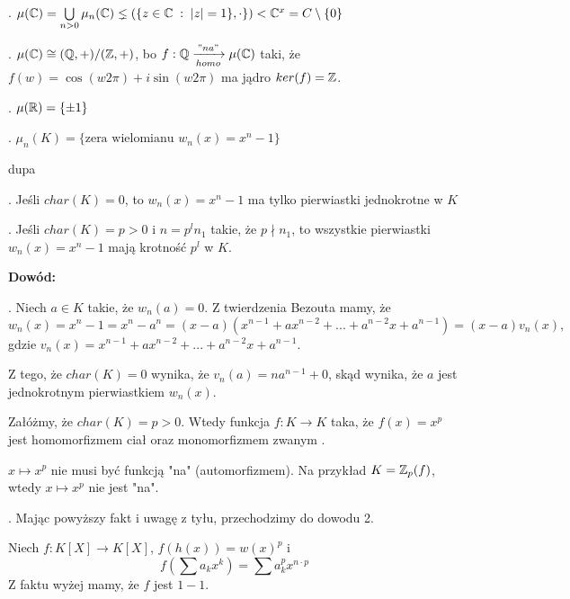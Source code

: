 . $\mu(\mathbb{C})=\bigcup\limits_{n>0}\mu_n(\mathbb{C})\lneq(\{z\in\mathbb{C}\;:\;|z|=1\},\cdot\})<\mathbb{C}^x=C\setminus\{0\}$

. $\mu(\mathbb{C})\cong(\mathbb{Q},+)/(\mathbb{Z},+)$, bo $f:\mathbb{Q}\xrightarrow[homo]{"na"}\mu(\mathbb{C})$ taki, że $f(w)=\cos(w2\pi)+i\sin(w2\pi)$ ma jądro $ker(f)=\mathbb{Z}$.

. $\mu(\mathbb{R})=\{\pm1\}$

. $\mu_n(K)=\{\text{zera wielomianu }w_n(x)=x^n-1\}$

\begin{uwaga}{\color{back}dupa}

. Jeśli $char(K)=0$, to $w_n(x)=x^n-1$ ma tylko pierwiastki jednokrotne w $K$

. Jeśli $char(K)=p>0$ i $n=p^ln_1$ takie, że $p\nmid n_1$, to wszystkie pierwiastki $w_n(x)=x^n-1$ mają krotność $p^l$ w $K$.
\end{uwaga}

\textbf{Dowód:}

. Niech $a\in K$ takie, że $w_n(a)=0$. Z twierdzenia Bezouta mamy, że
$$w_n(x)=x^n-1=x^n-a^n=(x-a)(x^{n-1}+ax^{n-2}+...+a^{n-2}x+a^{n-1})=(x-a)v_n(x),$$
gdzie $v_n(x)=x^{n-1}+ax^{n-2}+...+a^{n-2}x+a^{n-1}$.

Z tego, że $char(K)=0$ wynika, że $v_n(a)=na^{n-1}+0$, skąd wynika, że $a$ jest jednokrotnym pierwiastkiem $w_n(x)$.

\begin{fakt}
    Załóżmy, że $char(K)=p>0$. Wtedy funkcja $f:K\to K$ taka, że $f(x)=x^p$ jest homomorfizmem ciał oraz monomorfizmem zwanym .
\end{fakt}

\begin{uwaga}
    $x\mapsto x^p$ nie musi być funkcją "na" (automorfizmem). Na przykład $K=\mathbb{Z}_p(f)$, wtedy $x\mapsto x^p$ nie jest "na".
\end{uwaga}

. Mając powyższy fakt i uwagę z tyłu, przechodzimy do dowodu 2.

Niech $f:K[X]\to K[X]$, $f(h(x))=w(x)^p$ i 
$$f(\sum a_kx^k)=\sum a_k^px^{n\cdot p}$$
Z faktu wyżej mamy, że $f$ jest $1-1$.